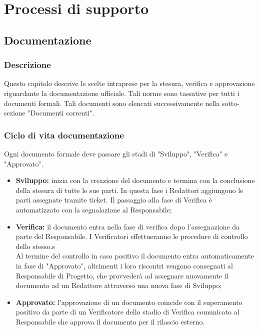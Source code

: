 \documentclass[NormeDiProgetto.tex]{subfiles}
\begin{document}
	
	
	\chapter{Processi di supporto}
	
	\section{Documentazione}
	\subsection{Descrizione}
	Questo capitolo descrive le scelte intraprese per la
	stesura, verifica e approvazione riguardante la documentazione ufficiale.
	Tali norme sono tassative per tutti i documenti formali.
	Tali documenti sono elencati successivamente nella sotto-sezione "Documenti correnti". 
	
	\subsection{Ciclo di vita documentazione}
	Ogni documento formale deve passare gli stadi di "Sviluppo", "Verifica" e "Approvato".
	\begin{itemize}
		\item \textbf{Sviluppo:} inizia con la creazione del documento e termina con la conclusione della stesura di tutte le sue parti. In questa fase i Redattori aggiungono le parti assegnate tramite ticket.
		Il passaggio alla fase di Verifica è automatizzato con la segnalazione al Responsabile;
		
		\item \textbf{Verifica:} il documento entra nella fase di verifica dopo l'assegnazione da parte del Responsabile. I Verificatori effettueranno le procedure di controllo dello stesso.s\\
		Al termine del controllo in caso positivo il documento entra automaticamente in fase di "Approvato", altrimenti i loro riscontri vengono consegnati al Responsabile di Progetto, che provvederà ad assegnare nuovamente il documento ad un Redattore attraverso una nuova fase di Sviluppo; 
		
		\item \textbf{Approvato:} l'approvazione di un documento coincide con il superamento positivo da parte di un Verificatore dello stadio di Verifica comunicato al Responsabile che approva il documento per il rilascio esterno.
	\end{itemize}
	
\end{document}
